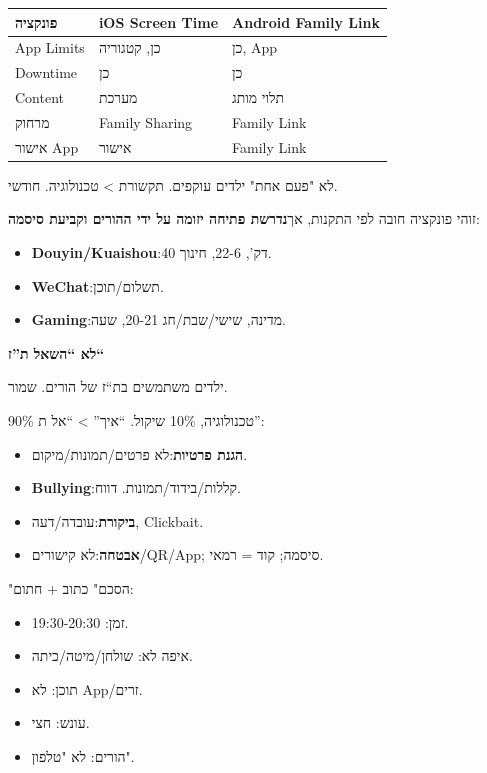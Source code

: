 \begin{center}
\begin{tabularx}{\linewidth}{|X|X|X|}
\hline
\textbf{פונקציה} & \textbf{iOS Screen Time} & \textbf{Android Family Link} \tabularnewline
\hline
App Limits & כן, קטגוריה & כן, App \tabularnewline
Downtime & כן & כן \tabularnewline
Content & מערכת & תלוי מותג \tabularnewline
מרחוק & Family Sharing & Family Link \tabularnewline
אישור App & אישור & Family Link \tabularnewline
\hline
\end{tabularx}
\end{center}

\begin{tcbwarn}{לא "פעם אחת"}
ילדים עוקפים. תקשורת > טכנולוגיה. חודשי.

\end{tcbwarn}


זוהי פונקציה חובה לפי התקנות, אך\textbf{נדרשת פתיחה יזומה על ידי ההורים וקביעת סיסמה}:

\begin{itemize}
  \item \textbf{Douyin/Kuaishou}:40 דק', 22-6, חינוך.
  \item \textbf{WeChat}:תשלום/תוכן.
  \item \textbf{Gaming}:מדינה, שישי/שבת/חג 20-21, שעה.
\end{itemize}

\textbf{לא “השאל ת”ז“}\par

ילדים משתמשים בת“ז של הורים. שמור.


90\% טכנולוגיה, 10\% שיקול. “איך” > “אל ת”:

\begin{itemize}
  \item \textbf{הגנת פרטיות}:לא פרטים/תמונות/מיקום.
  \item \textbf{Bullying}:קללות/בידוד/תמונות. דווח.
  \item \textbf{ביקורת}:עובדה/דעה, Clickbait.
  \item \textbf{אבטחה}:לא קישורים/QR/App; סיסמה; קוד = רמאי.
\end{itemize}

\begin{tcbpractice}{"הסכם"}
כתוב + חתום:

\begin{itemize}
  \item זמן: 19:30-20:30.
  \item איפה לא: שולחן/מיטה/כיתה.
  \item תוכן: לא App/זרים.
  \item עונש: חצי.
  \item הורים: לא "טלפון".
\end{itemize}

\end{tcbpractice}

